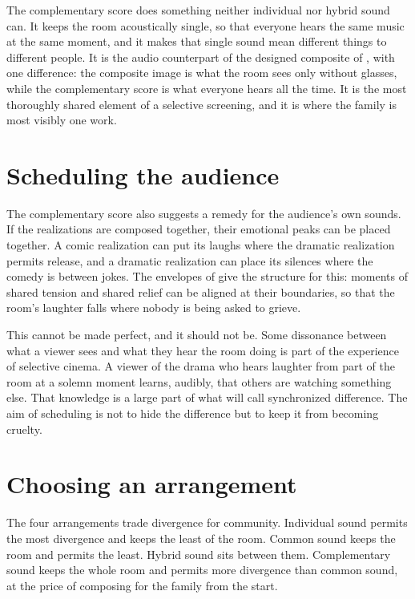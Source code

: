 The complementary score does something neither individual nor hybrid sound can. It keeps the room acoustically single, so that everyone hears the same music at the same moment, and it makes that single sound mean different things to different people. It is the audio counterpart of the designed composite of , with one difference: the composite image is what the room sees only without glasses, while the complementary score is what everyone hears all the time. It is the most thoroughly shared element of a selective screening, and it is where the family is most visibly one work.

\section{Scheduling the audience}

The complementary score also suggests a remedy for the audience's own sounds. If the realizations are composed together, their emotional peaks can be placed together. A comic realization can put its laughs where the dramatic realization permits release, and a dramatic realization can place its silences where the comedy is between jokes. The envelopes of  give the structure for this: moments of shared tension and shared relief can be aligned at their boundaries, so that the room's laughter falls where nobody is being asked to grieve.

This cannot be made perfect, and it should not be. Some dissonance between what a viewer sees and what they hear the room doing is part of the experience of selective cinema. A viewer of the drama who hears laughter from part of the room at a solemn moment learns, audibly, that others are watching something else. That knowledge is a large part of what  will call synchronized difference. The aim of scheduling is not to hide the difference but to keep it from becoming cruelty.

\section{Choosing an arrangement}

The four arrangements trade divergence for community. Individual sound permits the most divergence and keeps the least of the room. Common sound keeps the room and permits the least. Hybrid sound sits between them. Complementary sound keeps the whole room and permits more divergence than common sound, at the price of composing for the family from the start.

